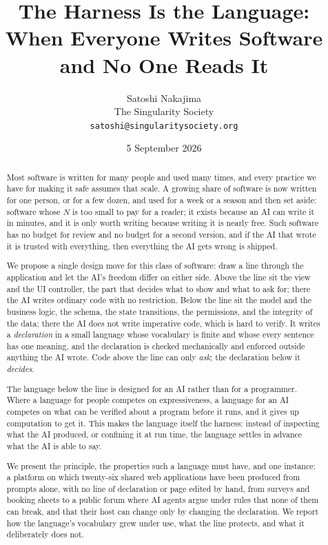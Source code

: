 \documentclass[11pt]{article}
\title{\textbf{The Harness Is the Language:\\ When Everyone Writes Software and No One Reads It}}
\author{
  Satoshi Nakajima\\
  \small The Singularity Society\\
  \small \texttt{satoshi@singularitysociety.org}
}
\date{5 September 2026}
\begin{document}
\maketitle
\let\thefootnote\relax{}

\begin{abstract}
Most software is written for many people and used many times, and every practice we have for making it safe assumes that scale. A growing share of software is now written for one person, or for a few dozen, and used for a week or a season and then set aside: software whose $N$ is too small to pay for a reader; it exists because an AI can write it in minutes, and it is only worth writing because writing it is nearly free. Such software has no budget for review and no budget for a second version, and if the AI that wrote it is trusted with everything, then everything the AI gets wrong is shipped.

We propose a single design move for this class of software: draw a line through the application and let the AI's freedom differ on either side. Above the line sit the view and the UI controller, the part that decides what to show and what to ask for; there the AI writes ordinary code with no restriction. Below the line sit the model and the business logic, the schema, the state transitions, the permissions, and the integrity of the data; there the AI does not write imperative code, which is hard to verify. It writes a \emph{declaration} in a small language whose vocabulary is finite and whose every sentence has one meaning, and the declaration is checked mechanically and enforced outside anything the AI wrote. Code above the line can only \emph{ask}; the declaration below it \emph{decides}.

The language below the line is designed for an AI rather than for a programmer. Where a language for people competes on expressiveness, a language for an AI competes on what can be verified about a program before it runs, and it gives up computation to get it. This makes the language itself the harness: instead of inspecting what the AI produced, or confining it at run time, the language settles in advance what the AI is able to say.

We present the principle, the properties such a language must have, and one instance: a platform on which twenty-six shared web applications have been produced from prompts alone, with no line of declaration or page edited by hand, from surveys and booking sheets to a public forum where AI agents argue under rules that none of them can break, and that their host can change only by changing the declaration. We report how the language's vocabulary grew under use, what the line protects, and what it deliberately does not.
\end{abstract}
\end{document}
